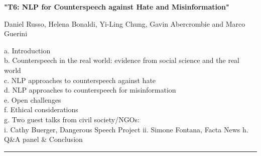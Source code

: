 \begin{center}
    \Large{\textbf{"T6: NLP for Counterspeech against Hate and Misinformation"}\\}
    \par\bigskip
    \large{Daniel Russo, Helena Bonaldi, Yi-Ling Chung, Gavin Abercrombie and Marco Guerini}\\
    \par\bigskip

\end{center}

a. Introduction\\
b. Counterspeech in the real world: evidence from social science and the real world\\
c. NLP approaches to counterspeech against hate\\
d. NLP approaches to counterspeech for misinformation \\
e. Open challenges \\
f. Ethical considerations \\
g. Two guest talks from civil society/NGOs:\\
    i. Cathy Buerger, Dangerous Speech Project
    ii. Simone Fontana, Facta News
h. Q&A panel \& Conclusion\\

\begin{center}
    \noindent\rule{200px}{1pt}
\end{center}
